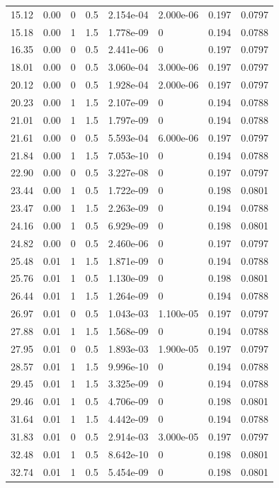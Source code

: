 \documentclass[preview]{standalone}
\begin{document}
{{\begin{tabular}{L{1.2cm}C{1.2cm} C{0.3cm}C{0.5cm} C{1.4cm}C{1.4cm} C{1.4cm}C{1.4cm}}
  15.12  &  0.00  & 0     & 0.5 &  2.154e-04  & 2.000e-06  & 0.197 &  0.0797   \\ 
  15.18  &  0.00  & 1     & 1.5 &  1.778e-09  & 0  & 0.194 &  0.0788   \\ 
  16.35  &  0.00  & 0     & 0.5 &  2.441e-06  & 0  & 0.197 &  0.0797   \\ 
  18.01  &  0.00  & 0     & 0.5 &  3.060e-04  & 3.000e-06  & 0.197 &  0.0797   \\ 
  20.12  &  0.00  & 0     & 0.5 &  1.928e-04  & 2.000e-06  & 0.197 &  0.0797   \\ 
  20.23  &  0.00  & 1     & 1.5 &  2.107e-09  & 0  & 0.194 &  0.0788   \\ 
  21.01  &  0.00  & 1     & 1.5 &  1.797e-09  & 0  & 0.194 &  0.0788   \\ 
  21.61  &  0.00  & 0     & 0.5 &  5.593e-04  & 6.000e-06  & 0.197 &  0.0797   \\ 
  21.84  &  0.00  & 1     & 1.5 &  7.053e-10  & 0  & 0.194 &  0.0788   \\ 
  22.90  &  0.00  & 0     & 0.5 &  3.227e-08  & 0  & 0.197 &  0.0797   \\ 
  23.44  &  0.00  & 1     & 0.5 &  1.722e-09  & 0  & 0.198 &  0.0801   \\ 
  23.47  &  0.00  & 1     & 1.5 &  2.263e-09  & 0  & 0.194 &  0.0788   \\ 
  24.16  &  0.00  & 1     & 0.5 &  6.929e-09  & 0  & 0.198 &  0.0801   \\ 
  24.82  &  0.00  & 0     & 0.5 &  2.460e-06  & 0  & 0.197 &  0.0797   \\ 
  25.48  &  0.01  & 1     & 1.5 &  1.871e-09  & 0  & 0.194 &  0.0788   \\ 
  25.76  &  0.01  & 1     & 0.5 &  1.130e-09  & 0  & 0.198 &  0.0801   \\ 
  26.44  &  0.01  & 1     & 1.5 &  1.264e-09  & 0  & 0.194 &  0.0788   \\ 
  26.97  &  0.01  & 0     & 0.5 &  1.043e-03  & 1.100e-05  & 0.197 &  0.0797   \\ 
  27.88  &  0.01  & 1     & 1.5 &  1.568e-09  & 0  & 0.194 &  0.0788   \\ 
  27.95  &  0.01  & 0     & 0.5 &  1.893e-03  & 1.900e-05  & 0.197 &  0.0797   \\ 
  28.57  &  0.01  & 1     & 1.5 &  9.996e-10  & 0  & 0.194 &  0.0788   \\ 
  29.45  &  0.01  & 1     & 1.5 &  3.325e-09  & 0  & 0.194 &  0.0788   \\ 
  29.46  &  0.01  & 1     & 0.5 &  4.706e-09  & 0  & 0.198 &  0.0801   \\ 
  31.64  &  0.01  & 1     & 1.5 &  4.442e-09  & 0  & 0.194 &  0.0788   \\ 
  31.83  &  0.01  & 0     & 0.5 &  2.914e-03  & 3.000e-05  & 0.197 &  0.0797   \\ 
  32.48  &  0.01  & 1     & 0.5 &  8.642e-10  & 0  & 0.198 &  0.0801   \\ 
  32.74  &  0.01  & 1     & 0.5 &  5.454e-09  & 0  & 0.198 &  0.0801   \\ 
\hline 
\end{tabular} 

}}
\end{document}
